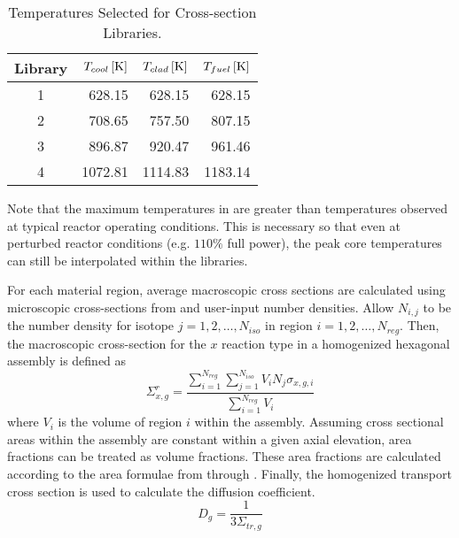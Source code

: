   \begin{table}
    \caption{Temperatures Selected for Cross-section Libraries.}
    \label{tab:xstemps}
    \begin{center}
      \begin{tabular}{crrr}
        \toprule
        Library & $T_{cool} \left[\text{{K}}\right]$ & $T_{clad} \left[\text{{K}}\right]$ & 
          $T_{fuel} \left[\text{{K}}\right]$ \\
        \midrule
        1 & 628.15 & 628.15 & 628.15  \\
        2 & 708.65 & 757.50 & 807.15  \\
        3 & 896.87 & 920.47 & 961.46 \\
        4 & 1072.81 & 1114.83 & 1183.14 \\
        \bottomrule
      \end{tabular}
    \end{center}
  \end{table}

  Note that the maximum temperatures in  are greater than 
  temperatures observed at typical reactor operating conditions. This is
  necessary so that even at perturbed reactor conditions (e.g. $110\%$ full
  power), the peak core temperatures can still be interpolated within the
  libraries.

  For each material region, average macroscopic cross
  sections are calculated using microscopic cross-sections from \mcc and  
  user-input number densities. Allow $N_{i,j}$ to be the number density for
  isotope ${j=1,2,\ldots,N_{iso}}$ in region ${i=1,2,\ldots,N_{reg}}$.
  Then, the macroscopic cross-section for the $x$ reaction type in a homogenized
  hexagonal assembly is defined as
  \begin{equation}
    \Sigma_{x,g}^r = \frac{\sum_{i=1}^{N_{reg}} \sum_{j=1}^{N_{iso}} V_i N_{j} 
      \sigma_{x,g,i}} {\sum_{i=1}^{N_{reg}}V_i}
  \end{equation}
  where $V_i$ is the volume of region $i$ within the assembly. Assuming cross
  sectional areas within the assembly are constant within a given axial
  elevation, area fractions can be treated as volume fractions. These area
  fractions are calculated according to the area formulae from
   through . Finally, the homogenized
  transport cross section is used to calculate the diffusion coefficient.
  \begin{equation}
    D_g = \frac{1}{3 \Sigma_{tr,g}}
  \end{equation}

